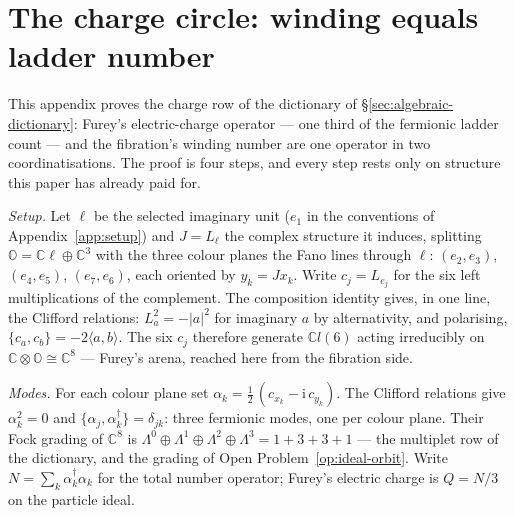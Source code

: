 
\section{The charge circle: winding equals ladder number}
\label{app:winding-number}

This appendix proves the charge row of the dictionary of \S\ref{sec:algebraic-dictionary}:
Furey's electric-charge operator --- one third of the fermionic ladder count --- and the
fibration's winding number are one operator in two coordinatisations. The proof is four steps,
and every step rests only on structure this paper has already paid for.

\emph{Setup.} Let $\ell$ be the selected imaginary unit ($e_{1}$ in the conventions of
Appendix~\ref{app:setup}) and $J = L_{\ell}$ the complex structure it induces, splitting
$\mathbb{O} = \mathbb{C}\ell \oplus \mathbb{C}^{3}$ with the three colour planes the Fano lines
through $\ell$: $(e_{2}, e_{3})$, $(e_{4}, e_{5})$, $(e_{7}, e_{6})$, each oriented by
$y_{k} = J x_{k}$. Write $c_{j} = L_{e_{j}}$ for the six left multiplications of the complement.
The composition identity gives, in one line, the Clifford relations: $L_{a}^{2} = -|a|^{2}$ for
imaginary $a$ by alternativity, and polarising, $\{c_{a}, c_{b}\} = -2\langle a, b\rangle$. The
six $c_{j}$ therefore generate $\mathbb{C}l(6)$ acting irreducibly on
$\mathbb{C} \otimes \mathbb{O} \cong \mathbb{C}^{8}$ --- Furey's arena, reached here from the
fibration side.

\emph{Modes.} For each colour plane set
$\alpha_{k} = \tfrac12\,(c_{x_{k}} - \mathrm{i}\, c_{y_{k}})$. The Clifford relations give
$\alpha_{k}^{2} = 0$ and $\{\alpha_{j}, \alpha_{k}^{\dagger}\} = \delta_{jk}$: three fermionic
modes, one per colour plane. Their Fock grading of $\mathbb{C}^{8}$ is
$\Lambda^{0} \oplus \Lambda^{1} \oplus \Lambda^{2} \oplus \Lambda^{3} = 1 + 3 + 3 + 1$ --- the
multiplet row of the dictionary, and the grading of Open Problem~\ref{op:ideal-orbit}. Write
$N = \sum_{k} \alpha_{k}^{\dagger}\alpha_{k}$ for the total number operator; Furey's electric
charge is $Q = N/3$ on the particle ideal.


